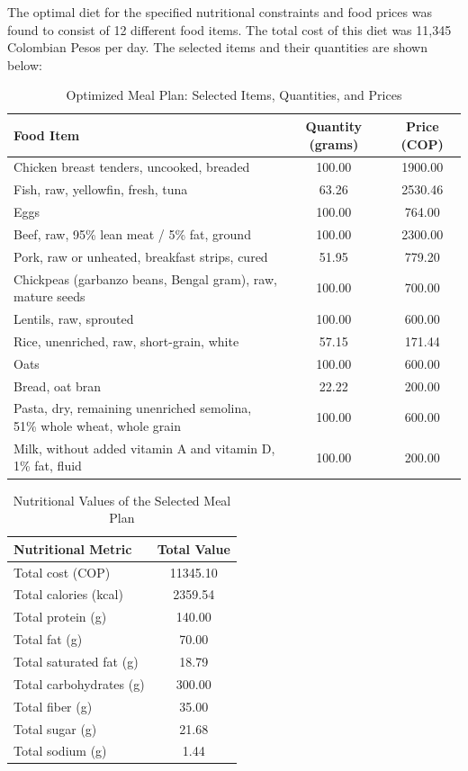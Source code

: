\documentclass[10pt]{article}
\begin{document}
The optimal diet for the specified nutritional constraints and food prices was found to consist of 12 different food items. The total cost of this diet was 11,345 Colombian Pesos per day. The selected items and their quantities are shown below:
\begin{table}[h!]
    \centering
    \begin{tabular}{|l|c|c|}
    \hline
    \textbf{Food Item} & \textbf{Quantity (grams)} & \textbf{Price (COP)} \\ \hline
    Chicken breast tenders, uncooked, breaded & 100.00 & 1900.00 \\ \hline
    Fish, raw, yellowfin, fresh, tuna & 63.26 & 2530.46 \\ \hline
    Eggs & 100.00 & 764.00 \\ \hline
    Beef, raw, 95\% lean meat / 5\% fat, ground & 100.00 & 2300.00 \\ \hline
    Pork, raw or unheated, breakfast strips, cured & 51.95 & 779.20 \\ \hline
    Chickpeas (garbanzo beans, Bengal gram), raw, mature seeds & 100.00 & 700.00 \\ \hline
    Lentils, raw, sprouted & 100.00 & 600.00 \\ \hline
    Rice, unenriched, raw, short-grain, white & 57.15 & 171.44 \\ \hline
    Oats & 100.00 & 600.00 \\ \hline
    Bread, oat bran & 22.22 & 200.00 \\ \hline
    Pasta, dry, remaining unenriched semolina, 51\% whole wheat, whole grain & 100.00 & 600.00 \\ \hline
    Milk, without added vitamin A and vitamin D, 1\% fat, fluid & 100.00 & 200.00 \\ \hline
    \end{tabular}
    \caption{Optimized Meal Plan: Selected Items, Quantities, and Prices}
    \label{tab:meal_plan_results_corrected}
    \end{table}
    
    \begin{table}[h!]
    \centering
    \begin{tabular}{|l|c|}
    \hline
    \textbf{Nutritional Metric} & \textbf{Total Value} \\ \hline
    Total cost (COP) & 11345.10 \\ \hline
    Total calories (kcal) & 2359.54 \\ \hline
    Total protein (g) & 140.00 \\ \hline
    Total fat (g) & 70.00 \\ \hline
    Total saturated fat (g) & 18.79 \\ \hline
    Total carbohydrates (g) & 300.00 \\ \hline
    Total fiber (g) & 35.00 \\ \hline
    Total sugar (g) & 21.68 \\ \hline
    Total sodium (g) & 1.44 \\ \hline
    \end{tabular}
    \caption{Nutritional Values of the Selected Meal Plan}
    \label{tab:meal_plan_nutrition_corrected}
    \end{table}
\end{document}
